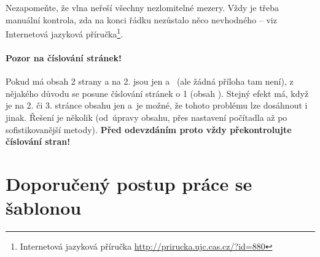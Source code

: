 Nezapomeňte, že vlna neřeší všechny nezlomitelné mezery. Vždy je třeba manuální kontrola, zda na konci řádku nezůstalo něco nevhodného -- viz Internetová jazyková příručka\footnote{Internetová jazyková příručka \url{http://prirucka.ujc.cas.cz/?id=880}}.

\paragraph {Pozor na číslování stránek!} Pokud má obsah 2 strany a na 2. jsou jen  a~ (ale žádná příloha tam není), z nějakého důvodu se posune číslování stránek o 1 (obsah ). Stejný efekt má, když je na 2. či 3. stránce obsahu jen  a~je možné, že tohoto problému lze dosáhnout i jinak. Řešení je několik (od~úpravy obsahu, přes nastavení počítadla až po sofistikovanější metody). \textbf{Před odevzdáním proto vždy překontrolujte číslování stran!}


\section*{Doporučený postup práce se šablonou}


